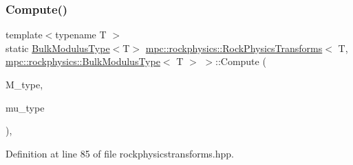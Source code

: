 \subsubsection{\texorpdfstring{Compute()}{Compute()}\hspace{0.1cm}{\footnotesize\ttfamily [6/8]}}
{\footnotesize\ttfamily template$<$typename T $>$ \\
static \mbox{\hyperlink{structmpc_1_1rockphysics_1_1_bulk_modulus_type}{Bulk\+Modulus\+Type}}$<$T$>$ \mbox{\hyperlink{structmpc_1_1rockphysics_1_1_rock_physics_transforms}{mpc\+::rockphysics\+::\+Rock\+Physics\+Transforms}}$<$ T, \mbox{\hyperlink{structmpc_1_1rockphysics_1_1_bulk_modulus_type}{mpc\+::rockphysics\+::\+Bulk\+Modulus\+Type}}$<$ T $>$ $>$\+::Compute (\begin{DoxyParamCaption}\item[{const \mbox{\hyperlink{structmpc_1_1rockphysics_1_1_compressional_modulus_type}{mpc\+::rockphysics\+::\+Compressional\+Modulus\+Type}}$<$ T $>$ \&}]{M\+\_\+type,  }\item[{const \mbox{\hyperlink{structmpc_1_1rockphysics_1_1_shear_modulus_type}{mpc\+::rockphysics\+::\+Shear\+Modulus\+Type}}$<$ T $>$ \&}]{mu\+\_\+type }\end{DoxyParamCaption})\hspace{0.3cm}{\ttfamily [inline]}, {\ttfamily [static]}}



Definition at line 85 of file rockphysicstransforms.\+hpp.

\mbox{\label{structmpc_1_1rockphysics_1_1_rock_physics_transforms_3_01_t_00_01mpc_1_1rockphysics_1_1_bulk_modulus_type_3_01_t_01_4_01_4_ae42a981ebb07f64fd73eb57402614a57}} 
